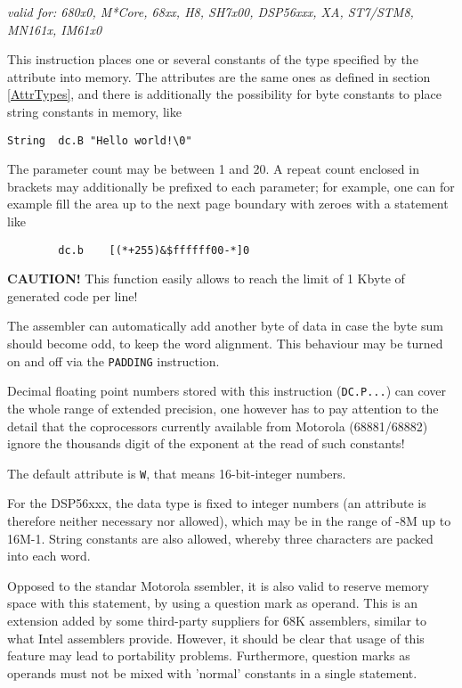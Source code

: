\documentclass[12pt,twoside]{report}
\newcommand{\bb}[1]{{\bf #1}}
\newcommand{\tty}[1]{{\tt #1}}
\begin{document}
{\em valid for: 680x0, M*Core, 68xx, H8, SH7x00, DSP56xxx, XA,
  ST7/STM8, MN161x, IM61x0}

This instruction places one or several constants of the type
specified by the attribute into memory.  The attributes are the same ones as
defined in section \ref{AttrTypes}, and there is additionally the
possibility for byte constants to place string constants in memory, like
\begin{verbatim}
String  dc.B "Hello world!\0"
\end{verbatim}
The parameter count may be between 1 and 20.  A repeat count enclosed
in brackets may additionally be prefixed to each parameter; for
example, one can for example fill the area up to the next page
boundary with zeroes with a statement like
\begin{verbatim}
        dc.b    [(*+255)&$ffffff00-*]0
\end{verbatim}
\bb{CAUTION!}  This function easily allows to reach the limit of 1 Kbyte
of generated code per line!

The assembler can automatically add another byte of data in case the byte sum
should become odd, to keep the word alignment.  This behaviour may be
turned on and off via the \tty{PADDING} instruction.

Decimal floating point numbers stored with this instruction (\tty{DC.P...})
can cover the whole range of extended precision, one however has to
pay attention to the detail that the coprocessors currently available
from Motorola (68881/68882) ignore the thousands digit of the
exponent at the read of such constants!

The default attribute is \tty{W}, that means 16-bit-integer numbers.

For the DSP56xxx, the data type is fixed to integer numbers (an attribute is
therefore neither necessary nor allowed), which may be in the range
of -8M up to 16M-1.  String constants are also allowed, whereby three characters
are packed into each word.

Opposed to the standar Motorola ssembler, it is also valid to reserve
memory space with this statement, by using a question mark as operand.
This is an extension added by some third-party suppliers for 68K
assemblers, similar to what Intel assemblers provide.  However, it should
be clear that usage of this feature may lead to portability problems.
Furthermore, question marks as operands must not be mixed with 'normal'
constants in a single statement.

\end{document}
